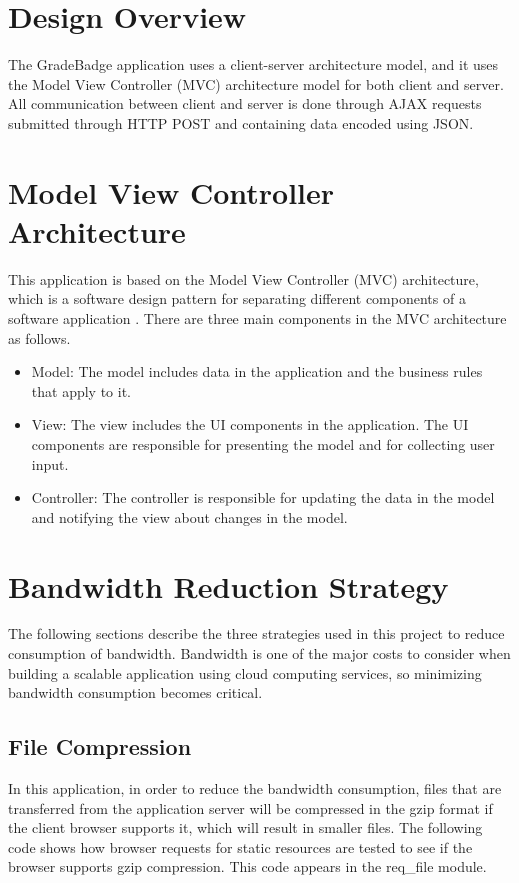 \lstset{breaklines=true}

\section{Design Overview}
The GradeBadge application uses a client-server architecture model, and it uses the Model View Controller (MVC) architecture model for both client and server. All communication between client and server is done through AJAX requests submitted through HTTP POST and containing data encoded using JSON.    

\section{Model View Controller Architecture}
This application is based on the Model View Controller (MVC) architecture,
which is a software design pattern for separating different components of a software application \cite{MVC}. There are three main components in the MVC architecture as follows.

\begin{itemize}
\item Model: The model includes data in the application and the business rules that apply to it.
\item View: The view includes the UI components in the application. The UI components are responsible for presenting the model and for collecting user input.
\item Controller: The controller is responsible for updating the data in the model and notifying the view about changes in the model.
\end{itemize}

\section{Bandwidth Reduction Strategy}
The following sections describe the three strategies used in this project to reduce consumption of bandwidth.  Bandwidth is one of the major costs to consider when building a scalable application using cloud computing services, so minimizing bandwidth consumption becomes critical.

\subsection{File Compression}
In this application, in order to reduce the bandwidth consumption, files that are transferred from the application server will be compressed in the gzip format if the client browser supports it, which will result in smaller files. The following code shows how browser requests for static resources are tested to see if the browser supports gzip compression.  This code appears in the req{\_}file module.

